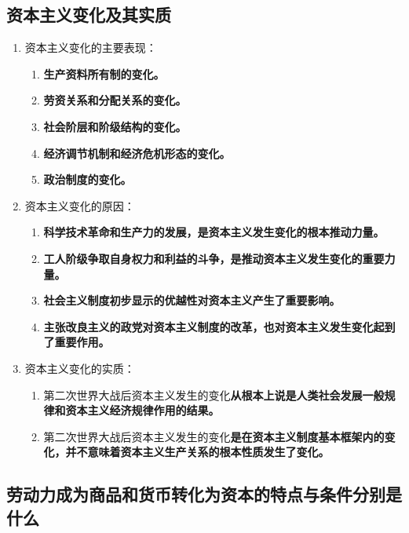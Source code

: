 \documentclass[12pt, a4paper, oneside]{ctexbook}
\begin{document}
\subsection{资本主义变化及其实质}

\begin{enumerate}
\item 资本主义变化的主要表现：
\begin{enumerate}
\item \textbf{生产资料所有制的变化。}
\item \textbf{劳资关系和分配关系的变化。}
\item \textbf{社会阶层和阶级结构的变化。}
\item \textbf{经济调节机制和经济危机形态的变化。}
\item \textbf{政治制度的变化。}
\end{enumerate}
\item 资本主义变化的原因：
\begin{enumerate}
\item \textbf{科学技术革命和生产力的发展，是资本主义发生变化的根本推动力量。}
\item \textbf{工人阶级争取自身权力和利益的斗争，是推动资本主义发生变化的重要力量。}
\item \textbf{社会主义制度初步显示的优越性对资本主义产生了重要影响。}
\item \textbf{主张改良主义的政党对资本主义制度的改革，也对资本主义发生变化起到了重要作用。}
\end{enumerate}
\item 资本主义变化的实质：
\begin{enumerate}
\item 第二次世界大战后资本主义发生的变化\textbf{从根本上说是人类社会发展一般规律和资本主义经济规律作用的结果。}
\item 第二次世界大战后资本主义发生的变化\textbf{是在资本主义制度基本框架内的变化，并不意味着资本主义生产关系的根本性质发生了变化。}
\end{enumerate}
\end{enumerate}

\subsection{劳动力成为商品和货币转化为资本的特点与条件分别是什么}
\end{document}
